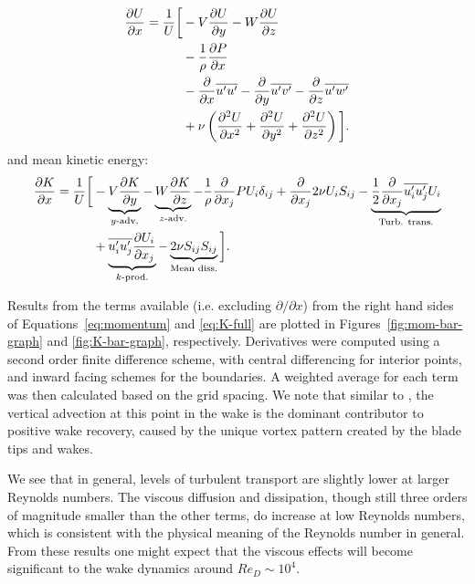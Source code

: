 \documentclass[energies,article,accept,moreauthors,pdftex,12pt,a4paper]{mdpi}
\def \p{\partial}
\begin{document}
\begin{equation}
	\begin{split}
		\frac{\p U}{\p x}  =  
		\frac{1}{U} \bigg{[}
		& - V\frac{\p U}{\p y}
		- W\frac{\p U}{\p z} \\
		& -\frac{1}{\rho}\frac{\p P}{\p x} \\
		& - \frac{\p}{\p x} \overline{u'u'}
		- \frac{\p}{\p y} \overline{u'v'}
		- \frac{\p}{\p z} \overline{u'w'} \\
		& + \nu\left(\frac{\p^2 U}{\p x^2}
		+ \frac{\p^2 U}{\p y^2}
		+ \frac{\p^2 U}{\p z^2} \right)
		\bigg{]}.
	\end{split}
	\label{eq:momentum}
\end{equation}
and mean kinetic energy:
\begin{equation}
	\begin{split}
		\frac{\p K}{\p x}
		=
		\frac{1}{U}
		\bigg{[}
		& - \underbrace{V \frac{\p K}{\p y}}_{y\text{-adv.}}
		- \underbrace{W \frac{\p K}{\p z}}_{z\text{-adv.}}
		- \frac{1}{\rho}\frac{\p}{\p x_j} P U_i \delta_{ij}
		+ \frac{\p}{\p x_j} 2 \nu U_i S_{ij} %
		- \underbrace{
		\frac{1}{2}\frac{\p}{\p x_j} \overline{u_i' u_j'} U_i
		}_{\text{Turb. trans.}} \\
		& + 
		\underbrace{
		\overline{u_i' u_j'} \frac{\p U_i}{\p x_j}
		}_{k\text{-prod.}}
		- 
		\underbrace{
		2 \nu S_{ij}S_{ij}
		}_{\text{Mean diss.}}
		\bigg{]}.
	\label{eq:K-full}
	\end{split}
\end{equation}

Results from the terms available (i.e. excluding $\partial / \partial x$) from
the right hand sides of Equations~\ref{eq:momentum} and \ref{eq:K-full} are
plotted in Figures~\ref{fig:mom-bar-graph} and \ref{fig:K-bar-graph},
respectively. Derivatives were computed using a second order finite difference
scheme, with central differencing for interior points, and inward facing schemes
for the boundaries. A weighted average for each term was then calculated based
on the grid spacing. We note that similar to \cite{Bachant2015-JoT}, the
vertical advection at this point in the wake is the dominant contributor to
positive wake recovery, caused by the unique vortex pattern created by the blade
tips and wakes.

We see that in general, levels of turbulent transport are slightly lower at
larger Reynolds numbers. The viscous diffusion and dissipation, though still
three orders of magnitude smaller than the other terms, do increase at low
Reynolds numbers, which is consistent with the physical meaning of the Reynolds
number in general. From these results one might expect that the viscous effects
will become significant to the wake dynamics around $Re_D \sim 10^4$.
\end{document}
